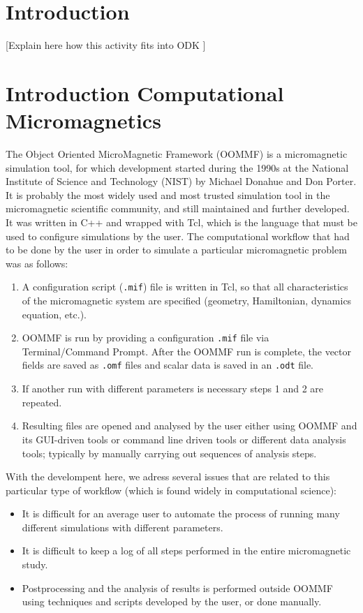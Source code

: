 \documentclass{deliverablereport}
\author{Marijan Beg and Hans Fangohr}
\begin{document}
\maketitle
\githubissuedescription
\newpage
\tableofcontents
\newpage

\section{Introduction}
[Explain here how this activity fits into ODK ]

\section{Introduction Computational Micromagnetics}

The Object Oriented MicroMagnetic Framework (OOMMF) is a micromagnetic
simulation tool, for which development started during the 1990s at the
National Institute of Science and Technology (NIST) by Michael Donahue
and Don Porter. It is probably the most widely used and most trusted
simulation tool in the micromagnetic scientific community, and still
maintained and further developed. It was
written in C++ and wrapped with Tcl, which is the language that must
be used to configure simulations by the user. The computational
workflow that had to be done by the user in order to simulate a
particular micromagnetic problem was as follows:

\begin{enumerate}
\item A configuration script (\texttt{.mif}) file is written in Tcl,
  so that all characteristics of the micromagnetic system are
  specified (geometry, Hamiltonian, dynamics equation, etc.).
\item OOMMF is run by providing a configuration \texttt{.mif} file via
  Terminal/Command Prompt. After the OOMMF run is complete, the vector
  fields are saved as \texttt{.omf} files and scalar data is saved in
  an \texttt{.odt} file.
\item If another run with different parameters is necessary steps 1
  and 2 are repeated.
\item Resulting files are opened and analysed by the user either using
  OOMMF and its GUI-driven tools or command line driven tools or
  different data analysis tools; typically by manually carrying out
  sequences of analysis steps.
\end{enumerate}

With the develompent here, we adress several issues that are related
to this particular type of workflow (which is found widely in
computational science):
\begin{itemize}
\item It is difficult for an average user to automate the process
of running many different simulations with different parameters.
\item It is difficult to keep a log of all steps performed in the
entire micromagnetic study.
\item Postprocessing and the analysis of results is performed outside
OOMMF using techniques and scripts developed by the user, or done manually.
\end{itemize}
\end{document}
